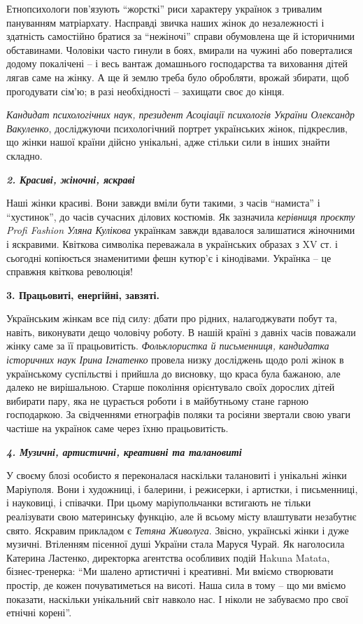 Етнопсихологи пов'язують \enquote{жорсткі} риси характеру українок з тривалим
пануванням матріархату. Насправді звичка наших жінок до незалежності і
здатність самостійно братися за \enquote{нежіночі} справи обумовлена ще й  історичними
обставинами. Чоловіки часто гинули в боях, вмирали на чужині або поверталися
додому покалічені – і весь вантаж домашнього господарства та виховання дітей
лягав саме на жінку. А ще й землю треба було обробляти, врожай збирати, щоб
прогодувати сім'ю; в разі необхідності –  захищати своє до кінця.

\emph{Кандидат психологічних наук, президент Асоціації психологів України Олександр
Вакуленко}, досліджуючи психологічний портрет українських жінок, підкреслив, що
жінки нашої країни дійсно унікальні, адже стільки сили в інших знайти складно.

\emph{\textbf{2. Красиві, жіночні, яскраві}}

Наші жінки красиві. Вони завжди вміли бути такими, з часів \enquote{намиста} і
\enquote{хустинок}, до часів сучасних ділових костюмів. Як зазначила \emph{керівниця
проєкту Profi Fashion Уляна Кулікова} українкам завжди вдавалося залишатися
жіночними і яскравими. Квіткова символіка переважала в українських образах з XV
ст. і сьогодні копіюється знаменитими фешн кутюр'є і кінодівами. Українка – це
справжня квіткова революція!

\textbf{3. Працьовиті, енергійні, завзяті.}

Українським жінкам все під силу: дбати про рідних, налагоджувати побут та,
навіть, виконувати дещо чоловічу роботу. В нашій країні з давніх часів поважали
жінку саме за її працьовитість. \emph{Фольклористка й письменниця, кандидатка
історичних наук Ірина Ігнатенко} провела низку досліджень щодо ролі жінок в
українському суспільстві і прийшла до висновку, що краса була бажаною, але
далеко не вирішальною. Старше покоління орієнтувало своїх дорослих дітей
вибирати пару, яка не цурається роботи і в майбутньому стане гарною
господаркою. За свідченнями етнографів поляки та росіяни звертали свою уваги
частіше на українок саме через їхню працьовитість.

\textbf{\emph{4. Музичні, артистичні, креативні та талановиті}}

У своєму блозі особисто я переконалася наскільки талановиті і унікальні жінки
Маріуполя. Вони і художниці, і балерини, і режисерки, і артистки, і
письменниці, і науковиці, і співачки. При цьому маріупольчанки встигають не
тільки реалізувати свою материнську функцію, але й всьому місту влаштувати
незабутнє свято. Яскравим прикладом є \emph{Тетяна Живолуга}. Звісно, українські жінки
і дуже музичні. Втіленням пісенної душі України стала Маруся Чурай. Як
наголосила Катерина Ластенко, директорка агентства особливих подій Hakuna
Matata, бізнес-тренерка: \enquote{Ми шалено артистичні і креативні. Ми вміємо
створювати простір, де кожен почуватиметься на висоті. Наша сила в тому – що ми
вміємо показати, наскільки унікальний світ навколо нас. І ніколи не забуваємо
про свої етнічні корені}.

